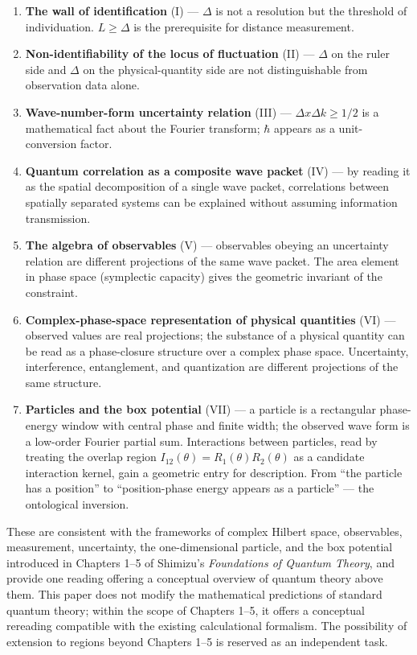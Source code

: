 \documentclass[
]{article}
\providecommand{\tightlist}{%
  \setlength{\itemsep}{0pt}\setlength{\parskip}{0pt}}
\begin{document}
\begin{enumerate}
\def\labelenumi{\arabic{enumi}.}
\tightlist
\item
  \textbf{The wall of identification} (I) --- \(\Delta\) is not a
  resolution but the threshold of individuation. \(L \geq \Delta\) is
  the prerequisite for distance measurement.
\item
  \textbf{Non-identifiability of the locus of fluctuation} (II) ---
  \(\Delta\) on the ruler side and \(\Delta\) on the physical-quantity
  side are not distinguishable from observation data alone.
\item
  \textbf{Wave-number-form uncertainty relation} (III) ---
  \(\Delta x \Delta k \geq 1/2\) is a mathematical fact about the
  Fourier transform; \(\hbar\) appears as a unit-conversion factor.
\item
  \textbf{Quantum correlation as a composite wave packet} (IV) --- by
  reading it as the spatial decomposition of a single wave packet,
  correlations between spatially separated systems can be explained
  without assuming information transmission.
\item
  \textbf{The algebra of observables} (V) --- observables obeying an
  uncertainty relation are different projections of the same wave
  packet. The area element in phase space (symplectic capacity) gives
  the geometric invariant of the constraint.
\item
  \textbf{Complex-phase-space representation of physical quantities}
  (VI) --- observed values are real projections; the substance of a
  physical quantity can be read as a phase-closure structure over a
  complex phase space. Uncertainty, interference, entanglement, and
  quantization are different projections of the same structure.
\item
  \textbf{Particles and the box potential} (VII) --- a particle is a
  rectangular phase-energy window with central phase and finite width;
  the observed wave form is a low-order Fourier partial sum.
  Interactions between particles, read by treating the overlap region
  \(I_{12}(\theta) = R_1(\theta) R_2(\theta)\) as a candidate
  interaction kernel, gain a geometric entry for description. From ``the
  particle has a position'' to ``position-phase energy appears as a
  particle'' --- the ontological inversion.
\end{enumerate}

These are consistent with the frameworks of complex Hilbert space,
observables, measurement, uncertainty, the one-dimensional particle, and
the box potential introduced in Chapters 1--5 of Shimizu's
\emph{Foundations of Quantum Theory}, and provide one reading offering a
conceptual overview of quantum theory above them. This paper does not
modify the mathematical predictions of standard quantum theory; within
the scope of Chapters 1--5, it offers a conceptual rereading compatible
with the existing calculational formalism. The possibility of extension
to regions beyond Chapters 1--5 is reserved as an independent task.
\end{document}
